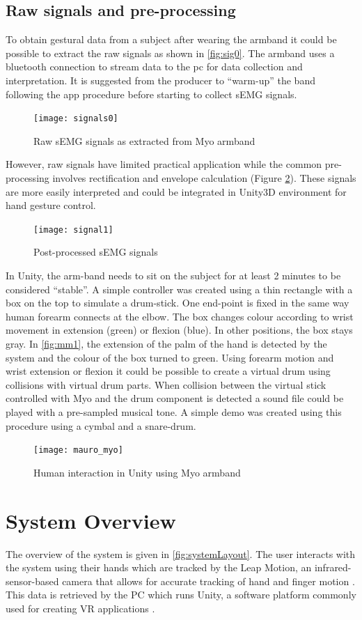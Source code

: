 \documentclass{vgtc}
\begin{document}
\subsection{Raw signals and pre-processing}
To obtain gestural data from a subject after wearing the armband it could be possible to extract the raw signals as shown in \autoref{fig:sig0}. The armband uses a bluetooth connection to stream data to the pc for data collection and interpretation. It is suggested from the producer to “warm-up” the band following the app procedure before starting to collect sEMG signals.
\begin{figure}[h]
\texttt{[image: signals0]}
\caption{Raw sEMG signals as extracted from Myo armband}
\centering
\label{fig:sig0}
\end{figure}
However, raw signals have limited practical application while the common pre-processing involves rectification and envelope calculation (Figure \ref{fig:sig1}). These signals are more easily interpreted and could be integrated in Unity3D environment for hand gesture control. 
\begin{figure}[h]
\texttt{[image: signal1]}
\caption{Post-processed sEMG signals}
\centering
\label{fig:sig1}
\end{figure}
In Unity, the arm-band needs to sit on the subject for at least 2 minutes to be considered “stable”. A simple controller was created using a thin rectangle with a box on the top to simulate a drum-stick. One end-point is fixed in the same way human forearm connects at the elbow. The box changes colour according to wrist movement in extension (green) or flexion (blue). In other positions, the box stays gray. In \autoref{fig:mm1}, the extension of the palm of the hand is detected by the system and the colour of the box turned to green. Using forearm motion and wrist extension or flexion it could be possible to create a virtual drum using collisions with virtual drum parts. When collision between the virtual stick controlled with Myo and the drum component is detected a sound file could be played with a pre-sampled musical tone. A simple demo was created using this procedure using a cymbal and a snare-drum.
\begin{figure}[h]
\texttt{[image: mauro\_myo]}
\caption{Human interaction in Unity using Myo armband}
\centering
\label{fig:mm1}
\end{figure}

\section{System Overview} \label{sec:sys}
The overview of the system is given in \autoref{fig:systemLayout}. The user interacts with the system using their hands which are tracked by the Leap Motion, an infrared-sensor-based camera that allows for accurate tracking of hand and finger motion . This data is retrieved by the PC which runs Unity, a software platform commonly used for creating VR applications \cite{unity}.
\end{document}

